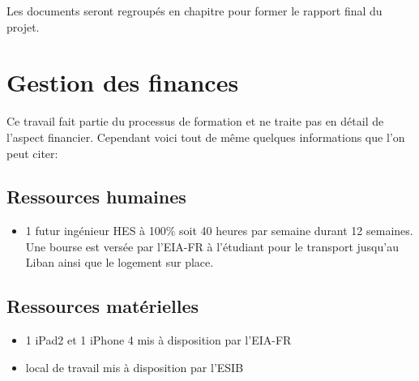 Les documents seront regroupés en chapitre pour former le rapport final du projet.

\section{Gestion des finances}
Ce travail fait partie du processus de formation et ne traite pas en détail de l'aspect financier. Cependant voici tout de même quelques informations que l'on peut citer:
\subsection{Ressources humaines}
\begin{itemize}
	\item 1 futur ingénieur HES  à 100\%  soit 40 heures par semaine durant 12 semaines. Une bourse est versée par  l'\gls{EIA-FR} à l'étudiant pour le transport jusqu'au Liban ainsi que le logement sur place. 
\end{itemize}
\subsection{Ressources matérielles}
\begin{itemize}
	\item 1 iPad2 et 1 iPhone 4  mis à disposition par l'\gls{EIA-FR}
	\item local de travail mis à disposition par l'\gls{ESIB}
\end{itemize}